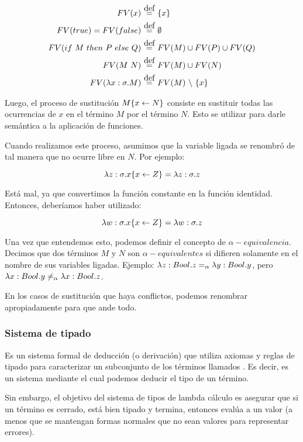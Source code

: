 \begin{align*}
FV(x) &\eqdef \{x\} \\
FV(true) = FV (false) &\eqdef \emptyset \\
FV(\ifte{M}{P}{Q}) &\eqdef FV(M) \cup FV(P) \cup FV(Q) \\
FV(\app{M}{N}) &\eqdef FV(M) \cup FV(N) \\
FV(\abs{x}{\sigma}{M}) &\eqdef FV(M)\ \backslash\ \{x\} \\
\end{align*}

Luego, el proceso de sustitución $M\{x \leftarrow N\}$ consiste en sustituir todas las ocurrencias  de $x$ en el término $M$ por el término $N$. Esto se utilizar para darle semántica a la aplicación de funciones.

Cuando realizamos este proceso, asumimos que la variable ligada se renombró de tal manera que no ocurre libre en $N$. Por ejemplo:

\[ \lambda z:\sigma.x\{x\leftarrow Z\} = \lambda z:\sigma.z\]

Está mal, ya que convertimos la función constante  en la función identidad. Entonces, deberíamos haber utilizado:

\[ \lambda w:\sigma.x\{x\leftarrow Z\} = \lambda w:\sigma.z\]

Una vez que entendemos esto, podemos definir el concepto de $\alpha-equivalencia$. Decimos que dos términos $M$ y $N$ son $\alpha-equivalentes$ si difieren solamente en el nombre de sus variables ligadas. Ejemplo: $\lambda z:Bool.z =_{\alpha} \lambda y:Bool.y$, pero $\lambda x:Bool.y \neq_{\alpha} \lambda x:Bool.z$.

En los casos de sustitución que haya conflictos, podemos renombrar apropiadamente para que ande todo.

\subsubsection{Sistema de tipado}

Es un sistema formal de deducción (o derivación) que utiliza axiomas y reglas de tipado para caracterizar un subconjunto de los términos llamados . Es decir, es un sistema mediante el cual podemos deducir el tipo de un término.

Sin embargo, el objetivo del sistema de tipos de lambda cálculo es asegurar que si un término es cerrado, está bien tipado y termina, entonces evalúa a un valor (a menos que se mantengan formas normales que no sean valores para representar errores).

